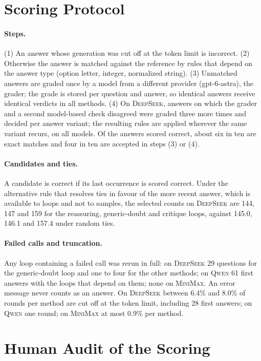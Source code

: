 \documentclass[11pt]{article}
\newcommand{\ds}{\textsc{DeepSeek}}
\newcommand{\qw}{\textsc{Qwen}}
\newcommand{\mm}{\textsc{MiniMax}}
\begin{document}
\section{Scoring Protocol}
\label{app:scoring}

\paragraph{Steps.}
(1) An answer whose generation was cut off at the token limit is incorrect.
(2) Otherwise the answer is matched against the reference by rules that depend on the answer type (option letter, integer, normalized string).
(3) Unmatched answers are graded once by a model from a different provider (gpt-6-astra), the grader; the grade is stored per question and answer, so identical answers receive identical verdicts in all methods.
(4) On \ds, answers on which the grader and a second model-based check disagreed were graded three more times and decided per answer variant; the resulting rules are applied wherever the same variant recurs, on all models.
Of the answers scored correct, about six in ten are exact matches and four in ten are accepted in steps (3) or (4).

\paragraph{Candidates and ties.}
A candidate is correct if its last occurrence is scored correct.
Under the alternative rule that resolves ties in favour of the more recent answer, which is available to loops and not to samples, the selected counts on \ds{} are 144, 147 and 159 for the reassuring, generic-doubt and critique loops, against 145.0, 146.1 and 157.4 under random ties.

\paragraph{Failed calls and truncation.}
Any loop containing a failed call was rerun in full: on \ds{} 29 questions for the generic-doubt loop and one to four for the other methods; on \qw{} 61 first answers with the loops that depend on them; none on \mm.
An error message never counts as an answer.
On \ds{} between 6.4\% and 8.0\% of rounds per method are cut off at the token limit, including 28 first answers; on \qw{} one round; on \mm{} at most 0.9\% per method.

\section{Human Audit of the Scoring}
\label{app:audit}
\end{document}
